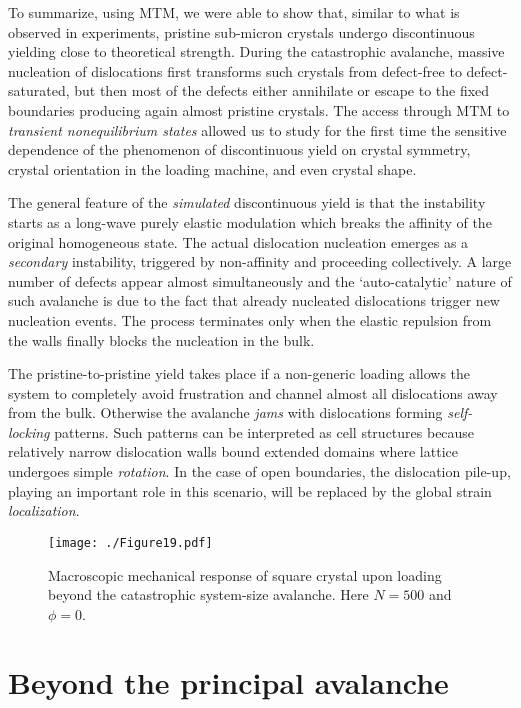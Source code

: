 \documentclass[CRPHYS,Unicode,manuscript]{cedram}
\begin{document}
 
To summarize, using MTM, we were able to show that, similar to what is observed in experiments, pristine sub-micron crystals  undergo discontinuous yielding close to theoretical strength. During the catastrophic avalanche,  massive nucleation of dislocations first transforms such crystals from defect-free to defect-saturated, but then most of the defects either annihilate or escape to the fixed boundaries producing again almost pristine crystals. The access through MTM to \emph{transient nonequilibrium states} allowed us to study for the first time the sensitive dependence of the phenomenon of discontinuous yield on crystal symmetry, crystal orientation in the loading machine, and even crystal shape.  

The general  feature  of the \emph{simulated} discontinuous yield is that  the instability   starts as  a long-wave purely elastic modulation which breaks the affinity of the original homogeneous state.  The actual dislocation nucleation emerges  as a \emph{secondary} instability,  triggered by   non-affinity and   proceeding  collectively. A large number of defects appear almost simultaneously and the  `auto-catalytic' nature of such avalanche  is due to the fact that   already nucleated dislocations trigger new  nucleation events. The process terminates  only when the elastic repulsion from the walls  finally blocks the nucleation in the bulk.

The pristine-to-pristine yield takes place if a non-generic loading allows the system to completely avoid frustration and channel almost all dislocations away from the bulk. Otherwise the avalanche \emph{jams} with dislocations forming \emph{self-locking} patterns. Such patterns can be interpreted as cell structures because relatively narrow  dislocation  walls   bound extended  domains where lattice undergoes simple \emph{rotation}.  In the case of open boundaries, the dislocation pile-up, playing an important role in this scenario, will be  replaced by the global  strain \emph{ localization}. %
\begin{figure}[h!]
\centering
\texttt{[image: ./Figure19.pdf]}
\caption{\scriptsize{Macroscopic mechanical  response of square crystal upon loading beyond  the catastrophic system-size avalanche.  Here $N=500$ and $\phi=0$.}
\label{fig:beyond}}
\end{figure}
%
\section{Beyond the principal  avalanche}
\end{document}
